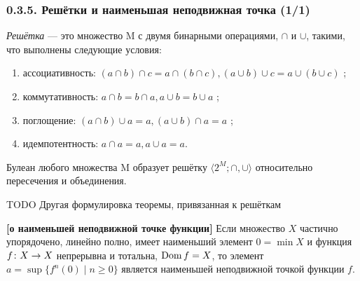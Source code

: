\documentclass[mathserif,12pt,aspectratio=169]{beamer}
\renewcommand{\index}[1]{}
\def\NB#1{{\bf\color{brown}#1}}
\def\odmkey#1#2{{\it\color{red} #1}\index{#2}}
\def\Dom{\operatorname{\rm Dom}}
\def\Map#1#2#3{{#1}\colon{#2}\nolinebreak\to\nolinebreak{#3}}
\let\ge\geqslant
\def\TODO#1{{\color{gray} TODO {#1}}}
\begin{document}
\begin{frame}

\frametitle{{0.3.5. Решётки и наименьшая неподвижная точка (1/1)}}

\odmkey{Решётка}{Решётка} — это множество M с двумя бинарными операциями, $\cap$ и $\cup$, такими, что выполнены следующие условия:
\begin{enumerate}
\item ассоциативность: $(a \cap b) \cap c = a \cap (b \cap c), (a \cup b) \cup c = a \cup (b \cup c)$ ;
\item коммутативность: $a \cap b = b \cap a, a \cup b = b \cup a$ ;
\item поглощение: $(a \cap b) \cup a = a, (a \cup b) \cap a = a$ ;
\item идемпотентность: $a \cap a = a, a \cup a = a $.
\end{enumerate}

\begin{example}
Булеан любого множества M образует решётку $\langle 2^M; \cap, \cup\rangle$ относительно пересечения и объединения.
\end{example}

\TODO{Другая формулировка теоремы, привязанная к решёткам}

\begin{theorem} {\NB{[о наименьшей неподвижной точке функции]}}
Если множество $X$ частично упорядочено, линейно полно, 
имеет наименьший элемент $0 = \min X$ и функция $\Map{f }{X}{X}$ непрерывна и тотальна, $\Dom f = X$, то элемент 
$a = \sup \{f^n(0) \mid n \ge 0\}$ является наименьшей неподвижной точкой функции $f$.
\end{theorem}

\end{frame}
\end{document}
